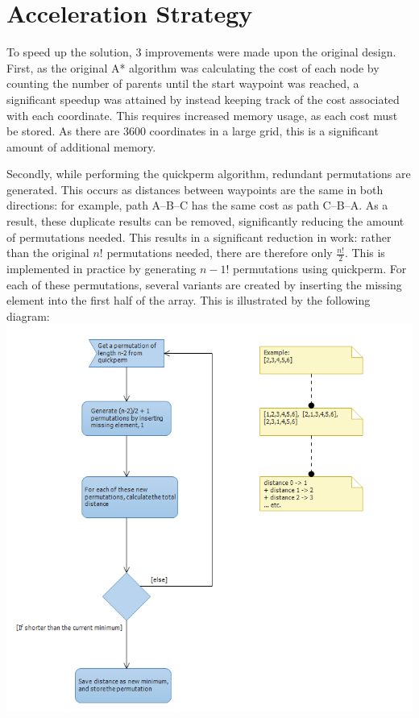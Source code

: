\documentclass[a4paper, 11pt]{article}
\begin{document}
\section{Acceleration Strategy} %
To speed up the solution, 3 improvements were made upon the original design. 
First, as the original A* algorithm was calculating the cost of each node by 
counting the number of parents until the start waypoint was reached, a significant 
speedup was attained by instead keeping track of the cost associated with each 
coordinate. This requires increased memory usage, as each cost must 
be stored. As there are 3600 coordinates in a large grid, this is a significant 
amount of additional memory. 
\par\bigskip\noindent
Secondly, while performing the quickperm algorithm, redundant permutations are
generated. This occurs as distances between waypoints are the same in both directions: 
for example, path A--B--C has the same cost as path C--B--A. As a result, these 
duplicate results can be removed, significantly reducing the amount of permutations 
needed. This results in a significant reduction in work: rather than the original 
$n!$ permutations needed, there are therefore only
$\frac{n!}{2}$. 
This is implemented in practice by generating $n-1!$ permutations using
quickperm. For each of these permutations, several variants are created by 
inserting the missing element into the first half of the array. 
This is illustrated by the following diagram: \\
\includegraphics[scale=0.8]{fpga_uml}
\end{document}
